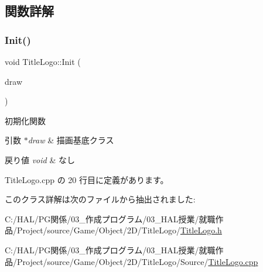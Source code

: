 \subsection{関数詳解}
\mbox{\label{class_title_logo_a1e07aae4771bd7a44cb7e3b55b72b9f3}} 
\subsubsection{\texorpdfstring{Init()}{Init()}}
{\footnotesize\ttfamily void Title\+Logo\+::\+Init (\begin{DoxyParamCaption}\item[{\mbox{\hyperlink{class_draw_base}{Draw\+Base}} $\ast$}]{draw }\end{DoxyParamCaption})}



初期化関数 


\begin{DoxyParams}{引数}
{\em $\ast$draw} & 描画基底クラス \\
\hline
\end{DoxyParams}

\begin{DoxyRetVals}{戻り値}
{\em void} & なし \\
\hline
\end{DoxyRetVals}


 Title\+Logo.\+cpp の 20 行目に定義があります。



このクラス詳解は次のファイルから抽出されました\+:\begin{DoxyCompactItemize}
\item 
C\+:/\+H\+A\+L/\+P\+G関係/03\+\_\+作成プログラム/03\+\_\+\+H\+A\+L授業/就職作品/\+Project/source/\+Game/\+Object/2\+D/\+Title\+Logo/\mbox{\hyperlink{_title_logo_8h}{Title\+Logo.\+h}}\item 
C\+:/\+H\+A\+L/\+P\+G関係/03\+\_\+作成プログラム/03\+\_\+\+H\+A\+L授業/就職作品/\+Project/source/\+Game/\+Object/2\+D/\+Title\+Logo/\+Source/\mbox{\hyperlink{_title_logo_8cpp}{Title\+Logo.\+cpp}}\end{DoxyCompactItemize}
